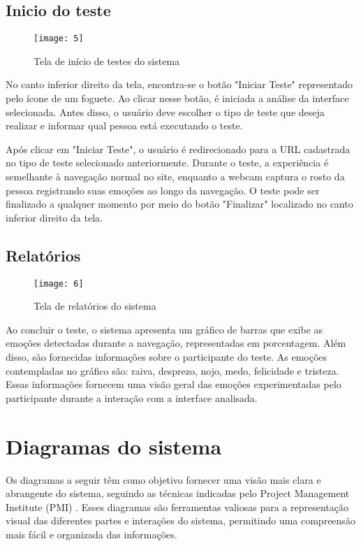 \clearpage
\subsection{Inicio do teste}

\begin{figure}[h]
  \caption{Tela de início de testes do sistema}
  \centering
  \texttt{[image: 5]}
\end{figure}
\FloatBarrier

No canto inferior direito da tela, encontra-se o botão "Iniciar Teste" representado pelo ícone de um foguete. Ao clicar nesse botão, é iniciada a análise da interface selecionada. Antes disso, o usuário deve escolher o tipo de teste que deseja realizar e informar qual pessoa está executando o teste.

Após clicar em "Iniciar Teste", o usuário é redirecionado para a URL cadastrada no tipo de teste selecionado anteriormente. Durante o teste, a experiência é semelhante à navegação normal no site, enquanto a webcam captura o rosto da pessoa registrando suas emoções ao longo da navegação. O teste pode ser finalizado a qualquer momento por meio do botão "Finalizar" localizado no canto inferior direito da tela.

\subsection{Relatórios}

\begin{figure}[h]
  \caption{Tela de relatórios do sistema}
  \centering
  \texttt{[image: 6]}
\end{figure}
\FloatBarrier

Ao concluir o teste, o sistema apresenta um gráfico de barras que exibe as emoções detectadas durante a navegação, representadas em porcentagem. Além disso, são fornecidas informações sobre o participante do teste. As emoções contempladas no gráfico são: raiva, desprezo, nojo, medo, felicidade e tristeza. Essas informações fornecem uma visão geral das emoções experimentadas pelo participante durante a interação com a interface analisada.

\section{Diagramas do sistema}

Os diagramas a seguir têm como objetivo fornecer uma visão mais clara e abrangente do sistema, seguindo as técnicas indicadas pelo Project Management Institute (PMI) \cite{31}. Esses diagramas são ferramentas valiosas para a representação visual das diferentes partes e interações do sistema, permitindo uma compreensão mais fácil e organizada das informações.

